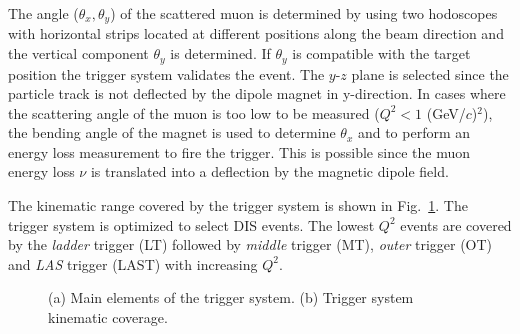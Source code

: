 The angle ($\theta_x,\theta_y$) of the scattered muon is determined by using two hodoscopes with horizontal strips located at different positions along the beam direction and the vertical component $\theta_y$ is determined. If $\theta_y$ is compatible with the target position the trigger system validates the event. The $y$-$z$ plane is selected since the particle track is not deflected by the dipole magnet in y-direction. In cases where the scattering angle of the muon is too low to be measured ($Q^2 < 1$ (GeV/$c$)$^2$), the bending angle of the magnet is used to determine $\theta_x$ and to perform an energy loss measurement to fire the trigger. This is possible since the muon energy loss $\nu$ is translated into a deflection by the magnetic dipole field.

The kinematic range covered by the trigger system is shown in Fig.~\ref{pic:trigger}. The trigger system is optimized to select DIS events. The lowest $Q^2$ events are covered by the \textit{ladder} trigger (LT) followed by \textit{middle} trigger (MT), \textit{outer} trigger (OT) and \textit{LAS} trigger (LAST) with increasing $Q^2$.

\begin{figure}[!h]
  \centering
	\caption{(a) Main elements of the trigger system. (b) Trigger system kinematic coverage.}
	\label{pic:trigger}
\end{figure}

